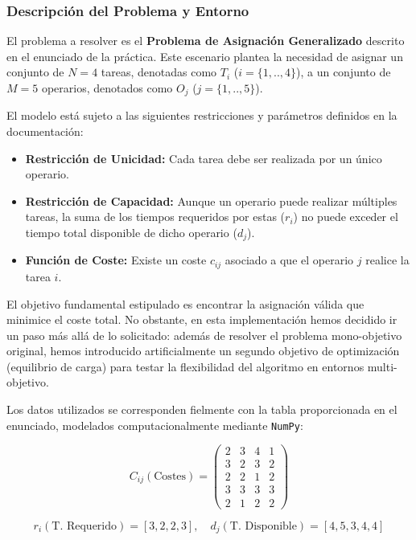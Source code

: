 \subsubsection{Descripción del Problema y Entorno}

El problema a resolver es el \textbf{Problema de Asignación Generalizado} descrito en el enunciado de la práctica. Este escenario plantea la necesidad de asignar un conjunto de $N=4$ tareas, denotadas como $T_i$ ($i=\{1,..,4\}$), a un conjunto de $M=5$ operarios, denotados como $O_j$ ($j=\{1,..,5\}$).

El modelo está sujeto a las siguientes restricciones y parámetros definidos en la documentación:
\begin{itemize}
    \item \textbf{Restricción de Unicidad:} Cada tarea debe ser realizada por un único operario.
    \item \textbf{Restricción de Capacidad:} Aunque un operario puede realizar múltiples tareas, la suma de los tiempos requeridos por estas ($r_i$) no puede exceder el tiempo total disponible de dicho operario ($d_j$).
    \item \textbf{Función de Coste:} Existe un coste $c_{ij}$ asociado a que el operario $j$ realice la tarea $i$.
\end{itemize}

El objetivo fundamental estipulado es encontrar la asignación válida que minimice el coste total. No obstante, en esta implementación hemos decidido ir un paso más allá de lo solicitado: además de resolver el problema mono-objetivo original, hemos introducido artificialmente un segundo objetivo de optimización (equilibrio de carga) para testar la flexibilidad del algoritmo en entornos multi-objetivo.

Los datos utilizados se corresponden fielmente con la tabla proporcionada en el enunciado, modelados computacionalmente mediante \texttt{NumPy}:

\begin{equation}
C_{ij} (\text{Costes}) = \begin{pmatrix}
2 & 3 & 4 & 1 \\
3 & 2 & 3 & 2 \\
2 & 2 & 1 & 2 \\
3 & 3 & 3 & 3 \\
2 & 1 & 2 & 2
\end{pmatrix}
\end{equation}

\begin{equation}
r_{i} (\text{T. Requerido}) = [3, 2, 2, 3], \quad
d_{j} (\text{T. Disponible}) = [4, 5, 3, 4, 4]
\end{equation}

